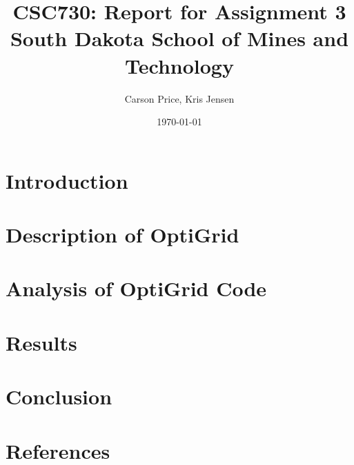 \documentclass{article}
\begin{document}
\onecolumn %
\setlength{\droptitle}{-6em} 
\title{CSC730: Report for Assignment 3 \\ \large South Dakota School of Mines and Technology}
\author{Carson Price, Kris Jensen}

\date{\today}
\maketitle

\begin{multicols}{2} %
    \let\clearpage\relax
    \section{Introduction}
    
    
    \let\clearpage\relax
    \section{Description of OptiGrid}
    

    \let\clearpage\relax
    \section{Analysis of OptiGrid Code}
    

    \let\clearpage\relax
    \section{Results}
    

    \let\clearpage\relax
    \section{Conclusion}
    

    \let\clearpage\relax
    \section{References}
    

\end{multicols}
\end{document}
